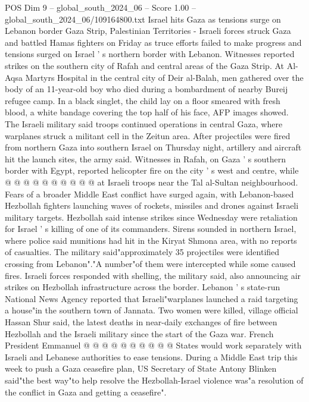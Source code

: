\begin{textsample}{POS Dim 9 – global\_south\_2024\_06 – Score 1.00 – global\_south\_2024\_06/109164800.txt}  \label{ex:f9_pos_059}
Israel hits Gaza as tensions surge on Lebanon border Gaza Strip, Palestinian Territories - Israeli forces struck Gaza and battled Hamas fighters on Friday as truce efforts failed to make progress and tensions surged on Israel ' s northern border with Lebanon.
Witnesses reported strikes on the southern city of Rafah and central areas of the Gaza Strip.
At Al-Aqsa Martyrs Hospital in the central city of Deir al-Balah, men gathered over the body of an 11-year-old boy who died during a bombardment of nearby Bureij refugee camp.
In a black singlet, the child lay on a floor smeared with fresh blood, a white bandage covering the top half of his face, AFP images showed.
The Israeli military said troops continued operations in central Gaza, where warplanes struck a militant cell in the Zeitun area.
After projectiles were fired from northern Gaza into southern Israel on Thursday night, artillery and aircraft hit the launch sites, the army said.
Witnesses in Rafah, on Gaza ' s southern border with Egypt, reported helicopter fire on the city ' s west and centre, while @ @ @ @ @ @ @ @ @ @ at Israeli troops near the Tal al-Sultan neighbourhood.
Fears of a broader Middle East conflict have surged again, with Lebanon-based Hezbollah fighters launching waves of rockets, missiles and drones against Israeli military targets.
Hezbollah said intense strikes since Wednesday were retaliation for Israel ' s killing of one of its commanders.
Sirens sounded in northern Israel, where police said munitions had hit in the Kiryat Shmona area, with no reports of casualties.
The military said"approximately 35 projectiles were identified crossing from Lebanon"."A number"of them were intercepted while some caused fires.
Israeli forces responded with shelling, the military said, also announcing air strikes on Hezbollah infrastructure across the border.
Lebanon ' s state-run National News Agency reported that Israeli"warplanes launched a raid targeting a house"in the southern town of Jannata.
Two women were killed, village official Hassan Shur said, the latest deaths in near-daily exchanges of fire between Hezbollah and the Israeli military since the start of the Gaza war.
French President Emmanuel @ @ @ @ @ @ @ @ @ @ States would work separately with Israeli and Lebanese authorities to ease tensions.
During a Middle East trip this week to push a Gaza ceasefire plan, US Secretary of State Antony Blinken said"the best way"to help resolve the Hezbollah-Israel violence was"a resolution of the conflict in Gaza and getting a ceasefire".

\end{textsample}
